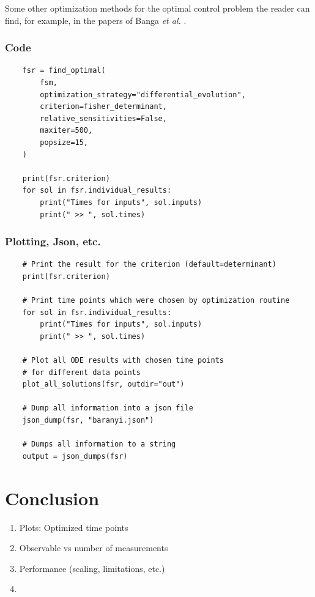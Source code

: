 \documentclass[10pt,A4paper]{article}
\newcommand{\etal}{{\textit{et al. }}}
\begin{document}
Some other optimization methods for the optimal control problem the reader can find, for example, in the papers of Banga \etal \cite{BANGA2005407, bangaImprovingFoodProcessing2003}.
%
\subsubsection*{Code}

\begin{verbatim}
    fsr = find_optimal(
        fsm,
        optimization_strategy="differential_evolution",
        criterion=fisher_determinant,
        relative_sensitivities=False,
        maxiter=500,
        popsize=15,
    )

    print(fsr.criterion)
    for sol in fsr.individual_results:
        print("Times for inputs", sol.inputs)
        print(" >> ", sol.times)
\end{verbatim}
%
\subsubsection*{Plotting, Json, etc.}
\begin{verbatim}
    # Print the result for the criterion (default=determinant)
    print(fsr.criterion)
    
    # Print time points which were chosen by optimization routine
    for sol in fsr.individual_results:
        print("Times for inputs", sol.inputs)
        print(" >> ", sol.times)

    # Plot all ODE results with chosen time points
    # for different data points
    plot_all_solutions(fsr, outdir="out")

    # Dump all information into a json file
    json_dump(fsr, "baranyi.json")

    # Dumps all information to a string
    output = json_dumps(fsr)
\end{verbatim}
%
%
%
\section*{Conclusion}
\begin{enumerate}
    \item Plots: Optimized time points
    \item Observable vs number of measurements
    \item Performance (scaling, limitations, etc.)
    \item 
\end{enumerate}
\end{document}
